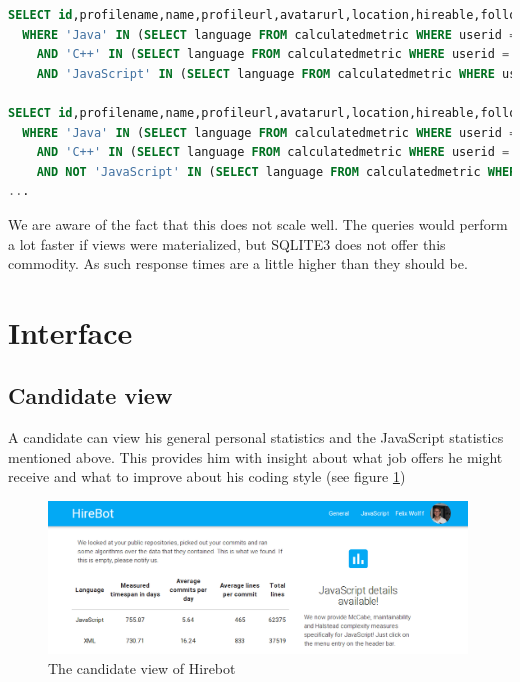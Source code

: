 \begin{minipage}{\linewidth}
\begin{lstlisting}[language=SQL, frame=false]
SELECT id,profilename,name,profileurl,avatarurl,location,hireable,followers,following FROM users u
  WHERE 'Java' IN (SELECT language FROM calculatedmetric WHERE userid = u.id AND timespan >= 360*1.5)
    AND 'C++' IN (SELECT language FROM calculatedmetric WHERE userid = u.id AND timespan >= 360*1.5)
    AND 'JavaScript' IN (SELECT language FROM calculatedmetric WHERE userid = u.id AND timespan >= 360*1.5)

SELECT id,profilename,name,profileurl,avatarurl,location,hireable,followers,following FROM users u
  WHERE 'Java' IN (SELECT language FROM calculatedmetric WHERE userid = u.id AND timespan >= 360*1.5)
    AND 'C++' IN (SELECT language FROM calculatedmetric WHERE userid = u.id AND timespan >= 360*1.5)
    AND NOT 'JavaScript' IN (SELECT language FROM calculatedmetric WHERE userid = u.id AND timespan >= 360*1.5)
...
\end{lstlisting}
\end{minipage}

We are aware of the fact that this does not scale well. The queries would perform a lot faster if views were materialized, but SQLITE3 does not offer this commodity. As such response times are a little higher than they should be.

\section{Interface}
\subsection{Candidate view}
A candidate can view his general personal statistics and the JavaScript statistics
mentioned above. This provides him with insight about what job offers he might
receive and what to improve about his coding style (see figure \ref{fig:candidateview})

\begin{figure}
  \includegraphics[width=30em]{gfx/candidateview.png}
  \caption{The candidate view of Hirebot}
  \label{fig:candidateview}
\end{figure}

